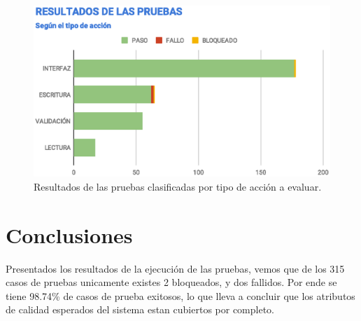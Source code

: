 \begin{figure}
\centering
\includegraphics[width=1.0\textwidth]{graphics/results-type.eps}
\caption{Resultados de las pruebas clasificadas por tipo de acción a evaluar.}
\label{results-type}
\end{figure}

\section{Conclusiones}
Presentados los resultados de la ejecución de las pruebas, vemos que de los 315
casos de pruebas unicamente existes 2 bloqueados, y dos fallidos. Por ende se
tiene 98.74\% de casos de prueba exitosos, lo que lleva a concluir que los
atributos de calidad esperados del sistema estan cubiertos por completo.

